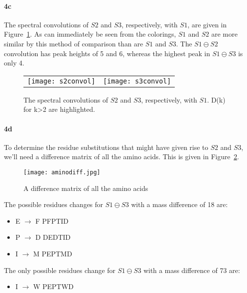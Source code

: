 \documentclass[12pt]{article}
\begin{document}
\paragraph{4c}  The spectral convolutions of $S2$ and $S3$, respectively, with $S1$, are given in Figure~\ref{convol}.  
As can immediately be seen from the colorings, $S1$ and $S2$ are more similar by this method of comparison than are $S1$ and $S3$.  The $S1\ominus S2$ convolution has peak heights of 5 and 6, whereas the highest peak in $S1\ominus S3$ is only 4.

\begin{figure}
\begin{center}
\begin{tabular}{cc}
\texttt{[image: s2convol]} & \texttt{[image: s3convol]}
\end{tabular}
\end{center}
\caption{The spectral convolutions of $S2$ and $S3$, respectively, with $S1$. D(k) for k>2 are highlighted.}
\label{convol}
\end{figure}

\paragraph{4d}  To determine the residue substitutions that might have given rise to $S2$ and $S3$, we'll need a difference matrix of all the amino acids.  This is given in Figure~\ref{aminodiff}.\\
\begin{figure}
\centering
\texttt{[image: aminodiff.jpg]}
\caption{A difference matrix of all the amino acids}
\label{aminodiff}
\end{figure}
The possible residues changes for $S1 \ominus S3$ with a mass difference of 18 are:
\begin{itemize}
  \item E $\rightarrow$ F  \hspace{1cm} PFPTID
  \item P $\rightarrow$ D  \hspace{1cm}DEDTID
  \item I $\rightarrow$ M   \hspace{1cm}PEPTMD
\end{itemize}

The only possible residues change for $S1 \ominus S3$ with a mass difference of 73 are:
\begin{itemize}
  \item I $\rightarrow$ W  \hspace{1cm} PEPTWD
\end{itemize}
\end{document}
